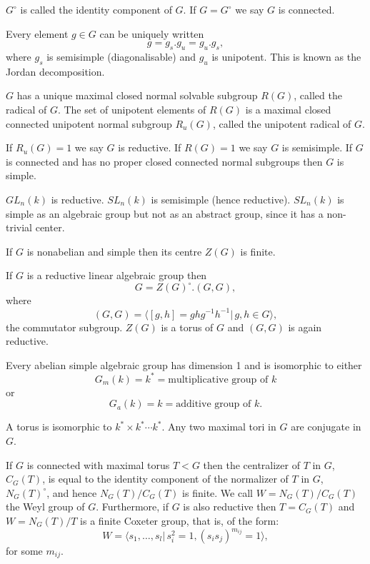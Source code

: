 $G^\circ$ is called the identity component of $G$. If $G = G^\circ$ we say $G$ is connected.

Every element $g\in G$ can be uniquely written
\begin{displaymath}
	g = g_s.g_u = g_u.g_s,
\end{displaymath}
where $g_s$ is semisimple (diagonalisable) and $g_u$ is unipotent. This is known as the Jordan decomposition.

$G$ has a unique maximal closed normal solvable subgroup $R(G)$, called the radical of $G$. The set of unipotent elements of $R(G)$ is a maximal closed connected unipotent normal subgroup $R_u(G)$, called the unipotent radical of $G$.

If $R_u(G) = {1}$ we say $G$ is reductive. If $R(G) = {1}$ we say $G$ is semisimple. If $G$ is connected and has no proper closed connected normal subgroups then $G$ is simple.

\begin{example}
	$GL_n(k)$ is reductive. $SL_n(k)$ is semisimple (hence reductive). $SL_n(k)$ is simple as an algebraic group but not as an abstract group, since it has a non-trivial center.
\end{example}

If $G$ is nonabelian and simple then its centre $Z(G)$ is finite.

If $G$ is a reductive linear algebraic group then
\begin{displaymath}
	G = Z(G)^\circ.(G,G),
\end{displaymath}
where
\begin{displaymath}
	(G,G) = \langle [g, h] = ghg^{-1}h^{-1}|\,g,h\in G\rangle,
\end{displaymath}
the commutator subgroup. $Z(G)$ is a torus of $G$ and $(G, G)$ is again reductive.

Every abelian simple algebraic group has dimension 1 and is isomorphic to either
\begin{displaymath}
	G_m(k) = k^* = \textrm{multiplicative group of }k
\end{displaymath}
or
\begin{displaymath}
	G_a(k) = k = \textrm{additive group of }k.
\end{displaymath}

A torus is isomorphic to $k^*\times k^*\cdots k^*$. Any two maximal tori in $G$ are conjugate in $G$. 

If $G$ is connected with maximal torus $T<G$ then the centralizer of $T$ in $G$, $C_G(T)$, is equal to the identity component of the normalizer of $T$ in $G$, $N_G(T)^\circ$, and hence $N_G(T)/C_G(T)$ is finite. We call $W = N_G(T)/C_G(T)$ the Weyl group of $G$. Furthermore, if $G$ is also reductive then $T=C_G(T)$ and $W = N_G(T)/T$ is a finite Coxeter group, that is, of the form:
\begin{displaymath}
  W = \langle s_1, \ldots, s_l |\, s_i^2 = 1, (s_is_j)^{m_{ij}} = 1\rangle,
\end{displaymath}
for some $m_{ij}$.

